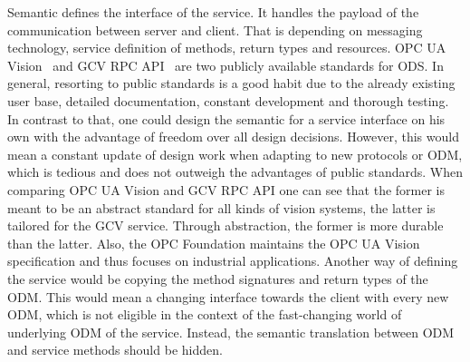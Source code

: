 \begin{table}[ht]
\begin{center}
\begin{minipage}{\textwidth}
      \end{minipage}
    \end{center}
\end{table}%


Semantic defines the interface of the service. It handles the payload of the communication between server and client. That is depending on messaging technology, service definition of methods, return types and resources. OPC UA Vision~\cite{VDMA2018OPCSpecification} and GCV RPC API~\cite{Google-Cloud-Documentation2018Cloud2018} are two publicly available standards for ODS. In general, resorting to public standards is a good habit due to the already existing user base, detailed documentation, constant development and thorough testing. In contrast to that, one could design the semantic for a service interface on his own with the advantage of freedom over all design decisions. However, this would mean a constant update of design work when adapting to new protocols or ODM, which is tedious and does not outweigh the advantages of public standards. When comparing OPC UA Vision and GCV RPC API one can see that the former is meant to be an abstract standard for all kinds of vision systems, the latter is tailored for the GCV service. Through abstraction, the former is more durable than the latter. Also, the OPC Foundation maintains the OPC UA Vision specification and thus focuses on industrial applications. Another way of defining the service would be copying the method signatures and return types of the ODM. This would mean a changing interface towards the client with every new ODM, which is not eligible in the context of the fast-changing world of underlying ODM of the service. Instead, the semantic translation between ODM and service methods should be hidden. 


